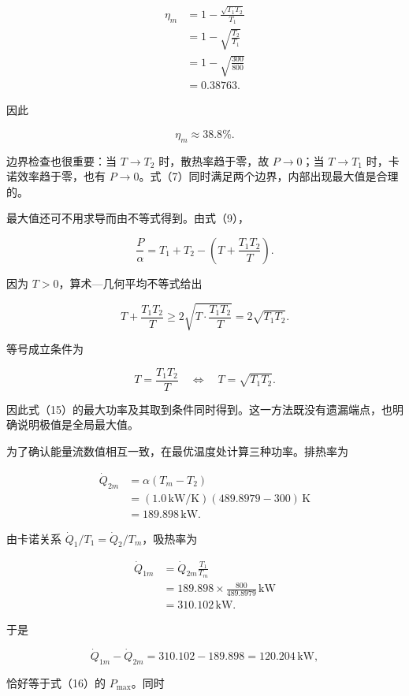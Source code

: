 \documentclass[12pt,a4paper,UTF8]{ctexart}
\begin{document}
\[
\begin{aligned}
\eta_m
&=1-\frac{\sqrt{T_1T_2}}{T_1}\\
&=1-\sqrt{\frac{T_2}{T_1}}\\
&=1-\sqrt{\frac{300}{800}}\\
&=0.38763.
\end{aligned} \tag{18}
\]

因此

\[
\boxed{\eta_m\approx38.8\%}. \tag{19}
\]

边界检查也很重要：当 \(T\to T_2\) 时，散热率趋于零，故 \(P\to0\)；当
\(T\to T_1\) 时，卡诺效率趋于零，也有
\(P\to0\)。式（7）同时满足两个边界，内部出现最大值是合理的。

最大值还可不用求导而由不等式得到。由式（9），

\[
\frac P\alpha
=T_1+T_2-\left(T+\frac{T_1T_2}{T}\right). \tag{20}
\]

因为 \(T>0\)，算术---几何平均不等式给出

\[
T+\frac{T_1T_2}{T}
\geqslant2\sqrt{T\cdot\frac{T_1T_2}{T}}
=2\sqrt{T_1T_2}. \tag{21}
\]

等号成立条件为

\[
T=\frac{T_1T_2}{T}
\quad\Longleftrightarrow\quad
T=\sqrt{T_1T_2}. \tag{22}
\]

因此式（15）的最大功率及其取到条件同时得到。这一方法既没有遗漏端点，也明确说明极值是全局最大值。

为了确认能量流数值相互一致，在最优温度处计算三种功率。排热率为

\[
\begin{aligned}
\dot Q_{2m}
&=\alpha(T_m-T_2)\\
&=(1.0\,\mathrm{kW/K})(489.8979-300)\,\mathrm K\\
&=189.898\,\mathrm{kW}.
\end{aligned} \tag{23}
\]

由卡诺关系 \(\dot Q_1/T_1=\dot Q_2/T_m\)，吸热率为

\[
\begin{aligned}
\dot Q_{1m}
&=\dot Q_{2m}\frac{T_1}{T_m}\\
&=189.898\times\frac{800}{489.8979}\,\mathrm{kW}\\
&=310.102\,\mathrm{kW}. 
\end{aligned} \tag{24}
\]

于是

\[
\dot Q_{1m}-\dot Q_{2m}
=310.102-189.898
=120.204\,\mathrm{kW}, \tag{25}
\]

恰好等于式（16）的 \(P_{\max}\)。同时
\end{document}

